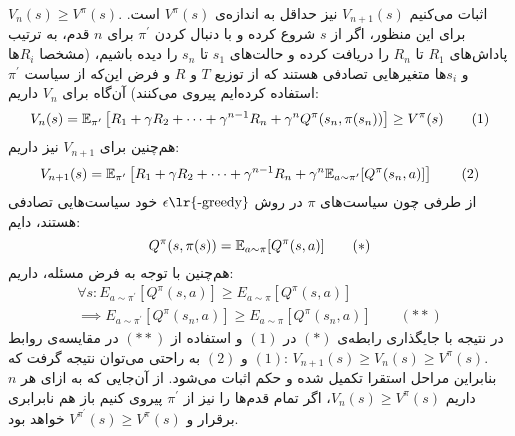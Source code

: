 \documentclass[a4paper, 12pt]{article}
\begin{document}
\begin{enumerate}[A)]
	$V_n(s) \ge V^\pi(s)$.
	اثبات می‌کنیم 
	$V_{n+1}(s)$
	نیز حداقل به اندازه‌ی $V^\pi(s)$ است. برای این منظور، اگر از $s$ شروع کرده و با دنبال کردن $\pi^\prime$ برای $n$ قدم، به ترتیب پاداش‌های $R_1$ تا $R_n$ را دریافت کرده و حالت‌های $s_1$ تا $s_n$ را دیده باشیم، (مشخصا $R_i$ها و $s_i$ها متغیرهایی تصادفی هستند که از توزیع $T$ و $R$ و فرض این‌که از سیاست $\pi^\prime$ استفاده کرده‌ایم پیروی می‌کنند) آن‌گاه برای $V_n$ داریم:
	\[
	V_n(s) = {\mathbb E}_{\pi^\prime}\left[R_1 + \gamma R_2 + \cdots + \gamma^{n-1}R_{n} + \gamma^n Q^\pi(s_n, \pi(s_{n}))\right] \ge V^\pi(s) \qquad (1)
	\]
	هم‌چنین برای $V_{n+1}$ نیز داریم:
	\[
	V_{n+1}(s) = {\mathbb E}_{\pi^\prime}\left[R_1 + \gamma R_2 + \cdots + \gamma^{n-1}R_n + \gamma^n {\mathbb E}_{a\sim \pi^\prime}[Q^\pi(s_n, a)]\right] \qquad (2)
	\]
	از طرفی چون سیاست‌های $\pi$ در روش
	$\epsilon\text{\lr{-greedy}}$
	خود سیاست‌هایی تصادفی هستند، دایم:
	\[
	Q^\pi(s, \pi(s)) = {\mathbb E}_{a\sim\pi}[Q^\pi(s, a)] \qquad (\ast)
	\]
	هم‌چنین با توجه به فرض مسئله، داریم:
	\[
	\begin{gathered}
		\forall s: E_{a\sim\pi^\prime}[Q^\pi(s, a)] \ge E_{a\sim\pi}[Q^\pi(s,a)] \\[0.4em]
		\implies E_{a\sim\pi^\prime}[Q^\pi(s_n, a)] \ge E_{a\sim\pi}[Q^\pi(s_n, a)] \qquad (\ast\ast)
	\end{gathered}
	\]
	در نتیجه با جایگذاری رابطه‌ی
	$(\ast)$
	در 
	$(1)$
	و استفاده از
	$(\ast\ast)$
	در مقایسه‌ی روابط
	$(1)$
	و
	$(2)$
	به راحتی می‌توان نتیجه گرفت که:
	$V_{n+1}(s) \ge V_n(s) \ge V^\pi(s)$.
	\\[3em]
	بنابراین مراحل استقرا تکمیل شده و حکم اثبات می‌شود. از آن‌جایی که به ازای هر $n$ داریم
	$V_n(s) \ge V^\pi(s)$،
	اگر تمام قدم‌ها را نیز از $\pi^\prime$ پیروی کنیم باز هم نابرابری برقرار و 
	$V^{\pi^\prime}(s) \ge V^\pi(s)$
	خواهد بود.
	\vfill
	\hrulefill
	
	\begin{center}
	\end{center}
\end{enumerate}
\end{document}
